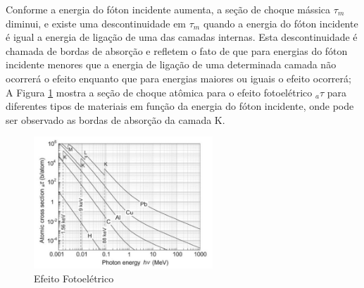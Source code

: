 \documentclass[11pt,a4paper]{article}
\begin{document}
            Conforme a energia do fóton incidente aumenta, a seção de choque mássica $\tau_m$ diminui, e existe uma descontinuidade em $\tau_m$ quando a energia do fóton incidente é igual a energia de ligação de uma das camadas internas. Esta descontinuidade é chamada de bordas de absorção e refletem o fato de que para energias do fóton incidente menores que a energia de ligação de uma determinada camada não ocorrerá o efeito enquanto que para energias maiores ou iguais o efeito ocorrerá; A Figura \ref{fig:descontinuidadeEfeitoFotoeletrico} mostra a seção de choque atômica para o efeito fotoelétrico ${}_a\tau$ para diferentes tipos de materiais em função da energia do fóton incidente, onde pode ser observado as bordas de absorção da camada K.

            \begin{figure}[h]
                \centering
                \includegraphics[width=0.6\textwidth]{Imagens/descontinuidadeEfeitoFotoeletrico.JPG}
                \caption{Efeito Fotoelétrico}
                \label{fig:descontinuidadeEfeitoFotoeletrico}
            \end{figure}
\end{document}
